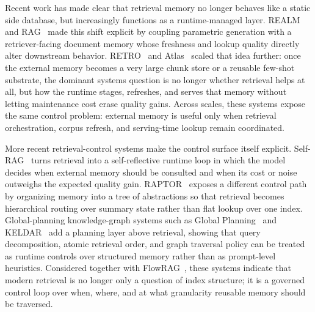 \documentclass[acmsmall,screen,review]{acmart}
\begin{document}
Recent work has made clear that retrieval memory no longer behaves like a static side database, but increasingly functions as a runtime-managed layer. REALM~\cite{guu2020realm} and RAG~\cite{lewis2020rag} made this shift explicit by coupling parametric generation with a retriever-facing document memory whose freshness and lookup quality directly alter downstream behavior. RETRO~\cite{borgeaud2022retro} and Atlas~\cite{izacard2022atlas} scaled that idea further: once the external memory becomes a very large chunk store or a reusable few-shot substrate, the dominant systems question is no longer whether retrieval helps at all, but how the runtime stages, refreshes, and serves that memory without letting maintenance cost erase quality gains. Across scales, these systems expose the same control problem: external memory is useful only when retrieval orchestration, corpus refresh, and serving-time lookup remain coordinated.

More recent retrieval-control systems make the control surface itself explicit. Self-RAG~\cite{asai2024selfrag} turns retrieval into a self-reflective runtime loop in which the model decides when external memory should be consulted and when its cost or noise outweighs the expected quality gain. RAPTOR~\cite{sarthi2024raptor} exposes a different control path by organizing memory into a tree of abstractions so that retrieval becomes hierarchical routing over summary state rather than flat lookup over one index. Global-planning knowledge-graph systems such as Global Planning~\cite{li2025global} and KELDAR~\cite{li2024keldar} add a planning layer above retrieval, showing that query decomposition, atomic retrieval order, and graph traversal policy can be treated as runtime controls over structured memory rather than as prompt-level heuristics. Considered together with FlowRAG~\cite{zhang2026flowrag}, these systems indicate that modern retrieval is no longer only a question of index structure; it is a governed control loop over when, where, and at what granularity reusable memory should be traversed.
\end{document}
